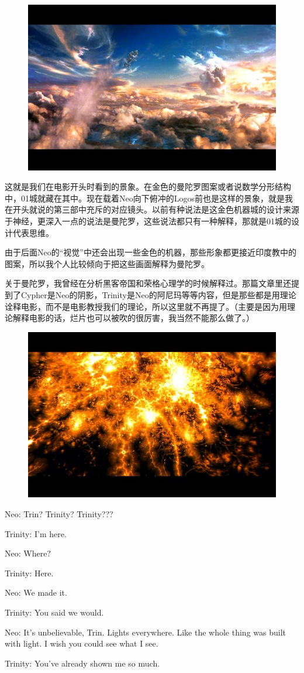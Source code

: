 \documentclass[UTF8]{ctexart}
\newenvironment{myquote}{\color{green} \setlength{\leftskip}{6em} \setlength{\rightskip}{4em} \setlength{\parindent}{-2em}}{\par}
\begin{document}
\begin{figure}[htb]
\centering
\includegraphics[width=0.5\linewidth]{fig/ced7c8eaaf4124d2d539c997.jpg}
\end{figure}

这就是我们在电影开头时看到的景象。在金色的曼陀罗图案或者说数学分形结构中，01城就藏在其中。现在载着Neo向下俯冲的Logos前也是这样的景象，就是我在开头就说的第三部中充斥的对应镜头。以前有种说法是这金色机器城的设计来源于神经，更深入一点的说法是曼陀罗，这些说法都只有一种解释，那就是01城的设计代表思维。

由于后面Neo的“视觉”中还会出现一些金色的机器，那些形象都更接近印度教中的图案，所以我个人比较倾向于把这些画面解释为曼陀罗。

关于曼陀罗，我曾经在分析黑客帝国和荣格心理学的时候解释过。那篇文章里还提到了Cypher是Neo的阴影，Trinity是Neo的阿尼玛等等内容，但是那些都是用理论诠释电影，而不是电影教授我们的理论，所以这里就不再提了。（主要是因为用理论解释电影的话，烂片也可以被吹的很厉害，我当然不能那么做了。）

\begin{figure}[htb]
\centering
\includegraphics[width=0.5\linewidth]{fig/af4b2cf5178e8c24bc3109b0.jpg}
\end{figure}

\begin{myquote}
Neo: Trin? Trinity? Trinity???

Trinity: I'm here.

Neo: Where?

Trinity: Here.

Neo: We made it.

Trinity: You said we would.

Neo: It's unbelievable, Trin. Lights everywhere. Like the whole thing was built with light. I wish you could see what I see.

Trinity: You've already shown me so much.
\end{myquote}
\end{document}
